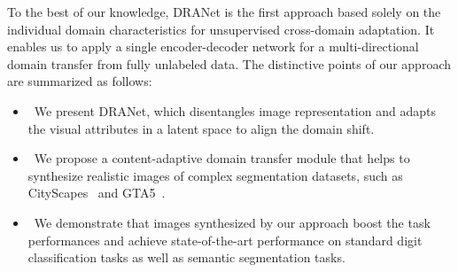\documentclass[final]{cvpr}
\begin{document}
To the best of our knowledge, DRANet is the first approach based solely on the individual domain characteristics for unsupervised cross-domain adaptation.
It enables us to apply a single encoder-decoder network for a multi-directional domain transfer from fully unlabeled data.
The distinctive points of our approach are summarized as follows:
\vspace{-1mm}
\begin{itemize}
\setlength\itemsep{0em}
\item~We present DRANet, which disentangles image representation and adapts the visual attributes in a latent space to align the domain shift. 
\vspace{-1mm}
\item~We propose a content-adaptive domain transfer module that helps to synthesize realistic images of complex segmentation datasets, such as CityScapes~\cite{cordts2016cityscapes} and GTA5~\cite{richter2016playing}.
\vspace{-1mm}
\item~We demonstrate that images synthesized by our approach boost the task performances and achieve state-of-the-art performance on standard digit classification tasks as well as semantic segmentation tasks.
\end{itemize}







 





 




















   
\end{document}
